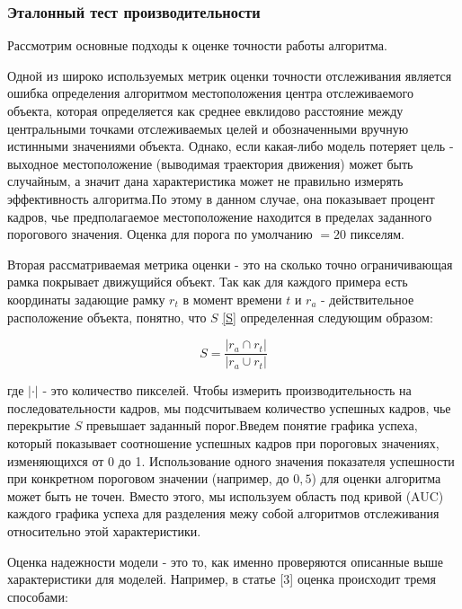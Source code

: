 \subsubsection{Эталонный тест производительности}

Рассмотрим основные подходы к оценке точности работы алгоритма. 

Одной из широко используемых метрик оценки точности отслеживания является ошибка определения алгоритмом местоположения центра отслеживаемого объекта, которая определяется как среднее евклидово расстояние между центральными точками отслеживаемых целей и обозначенными вручную истинными значениями объекта. Однако, если какая-либо модель потеряет цель - выходное местоположение (выводимая траектория движения) может быть случайным, а значит дана характеристика может не правильно измерять эффективность алгоритма.По этому в данном случае, она показывает процент кадров, чье предполагаемое местоположение находится в пределах заданного порогового значения. Оценка для порога по умолчанию $= 20$ пикселям.

Вторая рассматриваемая метрика оценки - это на сколько точно ограничивающая рамка покрывает движущийся объект.
Так как для каждого примера есть координаты задающие рамку $r_{t}$ в момент времени $t$ и $r_{a}$ - действительное расположение объекта, понятно, что $S$ \eqref{S} определенная следующим образом:

\begin{equation} \label{S}
    S = \dfrac{|r_{a} \cap r_{t}|}{|r_{a} \cup r_{t}|}
\end{equation}

где $| \cdot |$ - это количество пикселей. 
Чтобы измерить производительность на последовательности кадров, мы подсчитываем количество успешных кадров, чье перекрытие $S$ превышает заданный порог.Введем понятие  графика успеха, который показывает соотношение успешных кадров при пороговых значениях, изменяющихся от 0 до 1. Использование одного значения показателя успешности при конкретном пороговом значении (например, до $0,5$) для оценки алгоритма может быть не точен. Вместо этого, мы используем область под кривой (AUC) каждого графика успеха для разделения межу собой алгоритмов отслеживания относительно этой характеристики.

Оценка надежности модели - это то, как именно проверяются описанные выше характеристики для моделей. Например, в статье [3] оценка происходит тремя способами:

